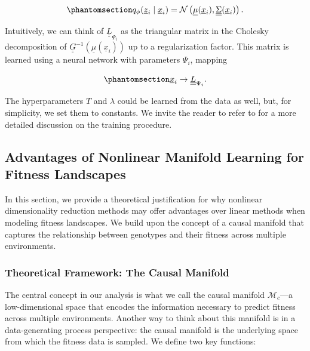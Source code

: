 \documentclass[
]{scrartcl}
\begin{document}
\begin{refsection}
\begin{equation}\phantomsection\label{eq-metric-tensor-rhvae-centroids}{
q_{\phi}(\underline{z}_i \mid \underline{x}_i) =
\mathcal{N}\left(
    \underline{\mu}{(\underline{x}_i)}, 
    \underline{\underline{\Sigma}}(\underline{x}_i)
\right).
}\end{equation}

Intuitively, we can think of \(\underline{\underline{L}}_{\Psi_i}\) as
the triangular matrix in the Cholesky decomposition of
\(\underline{\underline{G}}^{-1}(\underline{\mu}{(\underline{x}_i)})\)
up to a regularization factor. This matrix is learned using a neural
network with parameters \(\Psi_i\), mapping

\begin{equation}\phantomsection\label{eq-metric-tensor-rhvae-centroids-network}{
\underline{x}_i \rightarrow \underline{\underline{L}}_{\Psi_i}.
}\end{equation}

The hyperparameters \(T\) and \(\lambda\) could be learned from the data
as well, but, for simplicity, we set them to constants. We invite the
reader to refer to \autocite{chadebec2020} for a more detailed
discussion on the training procedure.

\subsection{Advantages of Nonlinear Manifold Learning for Fitness
Landscapes}\label{sec-nonlinear}

In this section, we provide a theoretical justification for why
nonlinear dimensionality reduction methods may offer advantages over
linear methods when modeling fitness landscapes. We build upon the
concept of a causal manifold that captures the relationship between
genotypes and their fitness across multiple environments.

\subsubsection{Theoretical Framework: The Causal
Manifold}\label{theoretical-framework-the-causal-manifold}

The central concept in our analysis is what we call the causal manifold
\(\mathcal{M}_c\)---a low-dimensional space that encodes the information
necessary to predict fitness across multiple environments. Another way
to think about this manifold is in a data-generating process
perspective: the causal manifold is the underlying space from which the
fitness data is sampled. We define two key functions:


\end{refsection}
\end{document}
